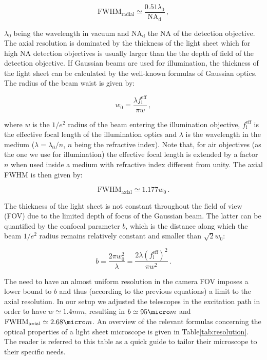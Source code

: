 \documentclass[12pt]{spieman}  %
\begin{document}
\begin{equation}
\text{FWHM}_{\text{radial}} \simeq \frac{0.51 \lambda_0}{\text{NA}_{\text{d}}} \, ,
\end{equation}

$\lambda_0$ being the wavelength in vacuum and $\text{NA}_{\text{d}}$ the NA of the detection objective. The axial resolution is dominated by the thickness of the light sheet which for high NA detection objectives is usually larger than the the depth of field of the detection objective. If Gaussian beams are used for illumination, the thickness of the light sheet can be calculated by the well-known formulas of Gaussian optics\cite{Teich}. The radius of the beam waist is given by:

\begin{equation}
w_0 = \frac{\lambda f_{\text{i}}^{\text{eff}}}{\pi w} \, ,
\end{equation}

where $w$ is the $1/e^2$ radius of the beam entering the illumination objective, $ f_{\text{i}}^{\text{eff}}$ is the effective focal length of the illumination optics and $\lambda$ is the wavelength in the medium ($\lambda = \lambda_0 / n$, $n$ being the refractive index). Note that, for air objectives (as the one we use for illumination) the effective focal length is extended by a factor $n$ when used inside a medium with refractive index different from unity\cite{Silvestri2012}.
The axial FWHM is then given by:

\begin{equation}
\text{FWHM}_{\text{axial}} \simeq 1.177 w_0 \, .
\end{equation}

The thickness of the light sheet is not constant throughout the field of view (FOV) due to the limited depth of focus of the Gaussian beam. The latter can be quantified by the confocal parameter $b$, which is the distance along which the beam $1/e^2$ radius remains relatively constant and smaller than $\sqrt{2} w_0$:

\begin{equation}
b = \frac{2\pi w_0^2}{\lambda} = \frac{2 \lambda  {(f_{\text{i}}^{\text{eff}})}^2}{\pi w^2}\, .
\end{equation}

The need to have an almost uniform resolution in the camera FOV imposes a lower bound to $b$ and thus (according to the previous equations) a limit to the axial resolution. In our setup we adjusted the telescopes in the excitation path in order to have $w \simeq 1.4mm$, resulting in $b \simeq 95 \micro m$ and $\text{FWHM}_{\text{axial}} \simeq 2.68 \micro m$. An overview of the relevant formulas concerning the optical properties of a light sheet microscope is given in Table\ref{tab:resolution}. The reader is referred to this table as a quick guide to tailor their microscope to their specific needs.
\end{document}
